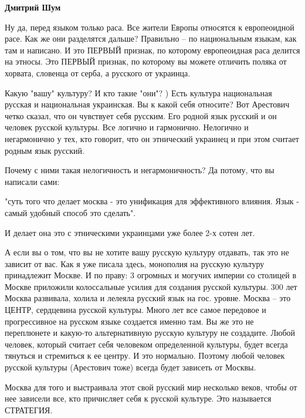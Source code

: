 \begin{itemize}
\begin{itemize}
\textbf{Дмитрий Шум} 

Ну да, перед языком только раса. Все жители Европы относятся к европеоидной
расе. Как же они разделятся дальше? Правильно – по национальным языкам, как там
и написано. И это ПЕРВЫЙ признак, по которому европеоидная раса делится на
этносы. Это ПЕРВЫЙ признак, по которому вы можете отличить поляка от хорвата,
словенца от серба, а русского от украинца.

Какую "вашу" культуру? И кто такие "они"? ) Есть культура национальная русская
и национальная украинская. Вы к какой себя относите? Вот Арестович четко
сказал, что он чувствует себя русским. Его родной язык русский и он человек
русской культуры. Все логично и гармонично. Нелогично и негармонично у тех, кто
говорит, что он этнический украинец и при этом считает родным язык русский.

Почему с ними такая нелогичность и негармоничность? Да потому, что вы написали
сами:

"суть того что делает москва - это унификация для эффективного влияния. Язык -
самый удобный способ это сделать".

И делает она это с этническими украинцами уже более 2-х сотен лет.

А если вы о том, что вы не хотите вашу русскую культуру отдавать, так это не
зависит от вас. Как я уже писала здесь, монополия на русскую культуру
принадлежит Москве. И по праву: 3 огромных и могучих империи со столицей в
Москве приложили колоссальные усилия для создания русской культуры. 300 лет
Москва развивала, холила и лелеяла русский язык на гос. уровне. Москва – это
ЦЕНТР, сердцевина русской культуры. Много лет все самое передовое и
прогрессивное на русском языке создается именно там. Вы же это не переплюнете и
какую-то альтернативную русскую культуру не создадите. Любой человек, который
считает себя человеком определенной культуры, будет всегда тянуться и
стремиться к ее центру. И это нормально. Поэтому любой человек русской культуры
(Арестович тоже) всегда будет зависеть от Москвы.

Москва для того и выстраивала этот свой русский мир несколько веков, чтобы от
нее зависели все, кто причисляет себя к русской культуре. Это называется
СТРАТЕГИЯ.

 

\end{itemize}
\end{itemize}
